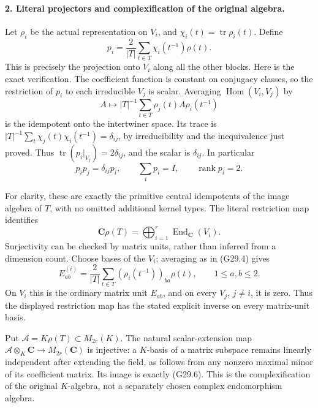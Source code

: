 \paragraph{2. Literal projectors and complexification of the original algebra.}
Let \(\rho_i\) be the actual representation on \(V_i\),
and \(\chi_i(t)=\operatorname{tr}\rho_i(t)\). Define
\[
       p_i=\frac{2}{|T|}\sum_{t\in T}
                            \chi_i(t^{-1})\rho(t).          \tag{G29.3}
\]
This is precisely the projection onto \(V_i\) along all
the other blocks. Here is the exact verification. The coefficient
function is constant on conjugacy classes, so the restriction
of \(p_i\) to each irreducible \(V_j\) is scalar. Averaging
\(\operatorname{Hom}(V_i,V_j)\) by
\[
           A\longmapsto |T|^{-1}\sum_{t\in T}
                              \rho_j(t)A\rho_i(t^{-1})
                                                               \tag{G29.4}
\]
is the idempotent onto the intertwiner space. Its trace is
\(|T|^{-1}\sum_t\chi_j(t)\chi_i(t^{-1})=\delta_{ij}\),
by irreducibility and the inequivalence just proved. Thus
\(\operatorname{tr}(p_i|_{V_j})=2\delta_{ij}\), and the
scalar is \(\delta_{ij}\). In particular
\[
       p_i p_j=\delta_{ij}p_i,\qquad
       \sum_i p_i=I,\qquad \operatorname{rank}p_i=2.        \tag{G29.5}
\]

For clarity, these are exactly the primitive central idempotents
of the image algebra of \(T\), with no omitted additional
kernel types. The literal restriction map identifies
\[
 \mathbf C\rho(T)=\bigoplus_{i=1}^r
                         \operatorname{End}_{\mathbf C}(V_i).
                                                               \tag{G29.6}
\]
Surjectivity can be checked by matrix units, rather than inferred
from a dimension count. Choose bases of the \(V_i\); averaging
as in (G29.4) gives
\[
 E^{(i)}_{ab}=\frac{2}{|T|}\sum_{t\in T}
                  (\rho_i(t^{-1}))_{ba}\rho(t),
                      \qquad 1\le a,b\le2.                 \tag{G29.7}
\]
On \(V_i\) this is the ordinary matrix unit \(E_{ab}\),
and on every \(V_j\), \(j\ne i\), it is zero. Thus
the displayed restriction map has the stated explicit inverse
on every matrix-unit basis.

Put \(\mathcal A=K\rho(T)\subset M_{2r}(K)\).
The natural scalar-extension map
\(\mathcal A\otimes_K\mathbf C\to M_{2r}(\mathbf C)\)
is injective: a \(K\)-basis of a matrix subspace remains
linearly independent after extending the field, as follows
from any nonzero maximal minor of its coefficient matrix.
Its image is exactly (G29.6). This is the complexification
of the original \(K\)-algebra, not a separately chosen
complex endomorphism algebra.

